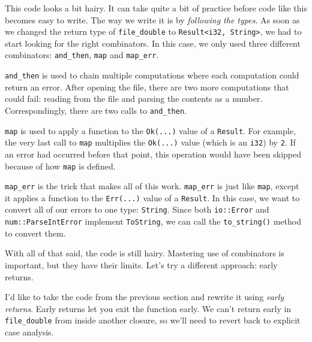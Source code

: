 \documentclass[a4paper,]{book}
\begin{document}
This code looks a bit hairy. It can take quite a bit of practice before
code like this becomes easy to write. The way we write it is by
\emph{following the types}. As soon as we changed the return type of
\texttt{file\_double} to
\texttt{Result\textless{}i32,\ String\textgreater{}}, we had to start
looking for the right combinators. In this case, we only used three
different combinators: \texttt{and\_then}, \texttt{map} and
\texttt{map\_err}.

\texttt{and\_then} is used to chain multiple computations where each
computation could return an error. After opening the file, there are two
more computations that could fail: reading from the file and parsing the
contents as a number. Correspondingly, there are two calls to
\texttt{and\_then}.

\texttt{map} is used to apply a function to the \texttt{Ok(...)} value
of a \texttt{Result}. For example, the very last call to \texttt{map}
multiplies the \texttt{Ok(...)} value (which is an \texttt{i32}) by
\texttt{2}. If an error had occurred before that point, this operation
would have been skipped because of how \texttt{map} is defined.

\texttt{map\_err} is the trick that makes all of this work.
\texttt{map\_err} is just like \texttt{map}, except it applies a
function to the \texttt{Err(...)} value of a \texttt{Result}. In this
case, we want to convert all of our errors to one type: \texttt{String}.
Since both \texttt{io::Error} and \texttt{num::ParseIntError} implement
\texttt{ToString}, we can call the \texttt{to\_string()} method to
convert them.

With all of that said, the code is still hairy. Mastering use of
combinators is important, but they have their limits. Let's try a
different approach: early returns.


I'd like to take the code from the previous section and rewrite it using
\emph{early returns}. Early returns let you exit the function early. We
can't return early in \texttt{file\_double} from inside another closure,
so we'll need to revert back to explicit case analysis.
\end{document}
